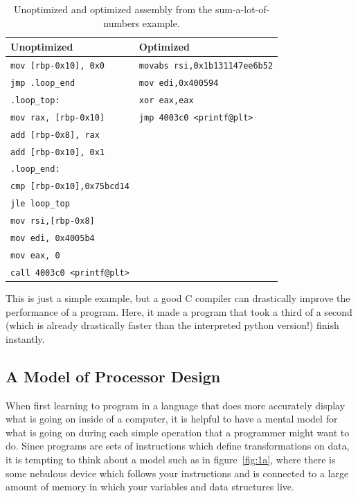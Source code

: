 \begin{table}[h]
	\centering
\begin{tabular}{l | l}
	\hline
	\textbf{Unoptimized} & \textbf{Optimized}\\
	\hline
	\texttt{mov [rbp-0x10], 0x0}	&\texttt{movabs rsi,0x1b131147ee6b52} \\
	\texttt{jmp .loop\_end			}	&\texttt{mov edi,0x400594} \\
	\texttt{.loop\_top:                } &\texttt{xor eax,eax   } \\
	\texttt{mov rax, [rbp-0x10]				}	&\texttt{jmp 4003c0 <printf@plt>}\\
	\texttt{add [rbp-0x8], rax				}	&\texttt{	} \\
	\texttt{add [rbp-0x10], 0x1				}	&\texttt{ }\\	
	\texttt{.loop\_end:                       } &\texttt{} \\
	\texttt{cmp [rbp-0x10],0x75bcd14} &\texttt{} \\
	\texttt{jle loop\_top} &\texttt{} \\
	\texttt{mov rsi,[rbp-0x8]} &\texttt{} \\
	\texttt{mov edi, 0x4005b4} &\texttt{} \\
	\texttt{mov eax, 0} &\texttt{} \\
	\texttt{call 4003c0 <printf@plt>} &\texttt{} \\
\end{tabular}
	\caption{Unoptimized and optimized assembly from the sum-a-lot-of-numbers example.}
	\label{table:assem-1}
\end{table}

This is just a simple example, but a good C compiler can drastically improve the performance of a
program. Here, it made a program that took a third of a second (which is already drastically faster than
the interpreted python version!) finish instantly.

\subsection{A Model of Processor Design}

When first learning to program in a language that does more accurately display what is going on
inside of a computer, it is helpful to have a mental model for what is going on during each
simple operation that a programmer might want to do. Since programs are sets of instructions
which define transformations on data, it is tempting to think about a model such as in figure~\ref{fig:1a},
where there is some nebulous device which follows your instructions and is connected to a large amount
of memory in which your variables and data structures live.


